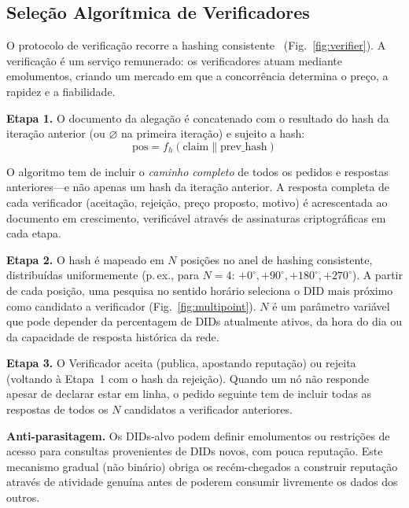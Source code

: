 \documentclass[11pt,a4paper,twocolumn]{article}
\begin{document}
\subsection{Seleção Algorítmica de Verificadores}

O protocolo de verificação recorre a hashing consistente~\cite{karger1997} (Fig.~\ref{fig:verifier}). A verificação é um serviço remunerado: os verificadores atuam mediante emolumentos, criando um mercado em que a concorrência determina o preço, a rapidez e a fiabilidade.

\textbf{Etapa 1.} O documento da alegação é concatenado com o resultado do hash da iteração anterior (ou $\varnothing$ na primeira iteração) e sujeito a hash:
\begin{equation}
\text{pos} = f_h(\text{claim} \| \text{prev\_hash})
\label{eq:hash}
\end{equation}

O algoritmo tem de incluir o \emph{caminho completo} de todos os pedidos e respostas anteriores---e não apenas um hash da iteração anterior. A resposta completa de cada verificador (aceitação, rejeição, preço proposto, motivo) é acrescentada ao documento em crescimento, verificável através de assinaturas criptográficas em cada etapa.

\textbf{Etapa 2.} O hash é mapeado em $N$ posições no anel de hashing consistente, distribuídas uniformemente (p.\,ex., para $N=4$: $+0^{\circ}, +90^{\circ}, +180^{\circ}, +270^{\circ}$). A partir de cada posição, uma pesquisa no sentido horário seleciona o DID mais próximo como candidato a verificador (Fig.~\ref{fig:multipoint}). $N$ é um parâmetro variável que pode depender da percentagem de DIDs atualmente ativos, da hora do dia ou da capacidade de resposta histórica da rede.

\textbf{Etapa 3.} O Verificador aceita (publica, apostando reputação) ou rejeita (voltando à Etapa~1 com o hash da rejeição). Quando um nó não responde apesar de declarar estar em linha, o pedido seguinte tem de incluir todas as respostas de todos os $N$ candidatos a verificador anteriores.

\textbf{Anti-parasitagem.} Os DIDs-alvo podem definir emolumentos ou restrições de acesso para consultas provenientes de DIDs novos, com pouca reputação. Este mecanismo gradual (não binário) obriga os recém-chegados a construir reputação através de atividade genuína antes de poderem consumir livremente os dados dos outros.
\end{document}
